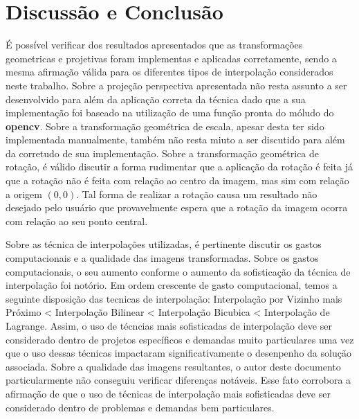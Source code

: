 \documentclass{article}
\begin{document}
%
\section{Discussão e Conclusão}
É possível verificar dos resultados apresentados que as transformações geometricas e projetivas foram implementas e aplicadas corretamente, sendo a mesma afirmação válida para os diferentes tipos de interpolação considerados neste trabalho. Sobre a projeção perspectiva apresentada não resta assunto a ser desenvolvido para além da aplicação correta da técnica dado que a sua implementação foi baseado na utilização de uma função pronta do móludo do \textbf{opencv}. Sobre a transformação geométrica de escala, apesar desta ter sido implementada manualmente, também não resta miuto a ser discutido para além da corretudo de sua implementação. Sobre a transformação geométrica de rotação, é válido discutir a forma rudimentar que a aplicação da rotação é feita já que a rotação não é feita com relação ao centro da imagem, mas sim com relação a origem $(0,0)$. Tal forma de realizar a rotação causa um resultado não desejado pelo usuário que provavelmente espera que a rotação da imagem ocorra com relação ao seu ponto central.


 Sobre as técnica de interpolações utilizadas, é pertinente discutir os gastos computacionais e a qualidade das imagens transformadas. Sobre os gastos computacionais, o seu aumento conforme o aumento da sofisticação da técnica de interpolação foi notório. Em ordem crescente de gasto computacional, temos a seguinte disposição das tecnicas de interpolação: Interpolação por Vizinho mais Próximo < Interpolação Bilinear < Interpolação Bicubica < Interpolação de Lagrange. Assim, o uso de técncias mais sofisticadas de interpolação deve ser considerado dentro de projetos específicos e demandas muito particulares uma vez que o uso dessas técnicas impactaram significativamente o desenpenho da solução associada. Sobre a qualidade das imagens resultantes, o autor deste documento particularmente não conseguiu verificar diferenças notáveis. Esse fato corrobora a afirmação de que o uso de técnicas de interpolação mais sofisticadas deve ser considerado dentro de problemas e demandas bem particulares.
\end{document}
